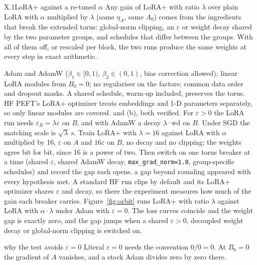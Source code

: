\begin{prediction}{X.1}{LoRA+ against a re-tuned $\alpha$}
Any gain of LoRA+ with ratio $\lambda$ over plain LoRA with $\alpha$ multiplied by $\lambda$ (same $\eta_A$, same $A_0$)
comes from the ingredients that break the extended torus: global-norm clipping, an $\varepsilon$ or weight decay shared
by the two parameter groups, and schedules that differ between the groups. With all of them off, or rescaled per block,
the two runs produce the same weights at every step in exact arithmetic.
\begin{predmeta}
   Adam and AdamW ($\beta_1\in[0,1)$, $\beta_2\in(0,1)$, bias correction allowed); linear LoRA modules
    from $B_0=0$; no regulariser on the factors; common data order and dropout masks. A shared schedule, warm-up
    included, preserves the torus. HF PEFT's LoRA+ optimizer treats embeddings and 1-D parameters separately, so only
    linear modules are covered.
    and (b), both verified. For $\varepsilon>0$
    the LoRA run needs $\varepsilon_B=\lambda\varepsilon$ on $B$, and with AdamW a decay $\lambda\cdot\mathrm{wd}$ on
    $B$. Under SGD the matching scale is $\sqrt\lambda\,s$.
   Train LoRA+ with $\lambda=16$ against LoRA with $\alpha$ multiplied by 16, $\varepsilon$ on $A$ and
    $16\varepsilon$ on $B$, no decay and no clipping; the weights agree bit for bit, since 16 is a power of two. Then
    switch on one torus breaker at a time (shared $\varepsilon$, shared AdamW decay, \texttt{max\_grad\_norm=1.0},
    group-specific schedules) and record the gap each opens.
   a gap beyond rounding appeared with every hypothesis met. A standard HF run clips by default
    and its LoRA+ optimizer shares $\varepsilon$ and decay, so there the experiment measures how much of the gain each
    breaker carries.
   Figure~\ref{fig:orbit} runs LoRA+ with ratio $\lambda$ against LoRA with $\alpha\cdot\lambda$ under
    Adam with $\varepsilon=0$. The loss curves coincide and the weight gap is exactly zero, and the gap jumps when a
    shared $\varepsilon>0$, decoupled weight decay or global-norm clipping is switched on.
\end{predmeta}
\end{prediction}

\begin{remark*}{why the test avoids $\varepsilon=0$}
Literal $\varepsilon=0$ needs the convention $0/0=0$. At $B_0=0$ the gradient of $A$ vanishes, and a stock Adam divides
zero by zero there.
\end{remark*}

